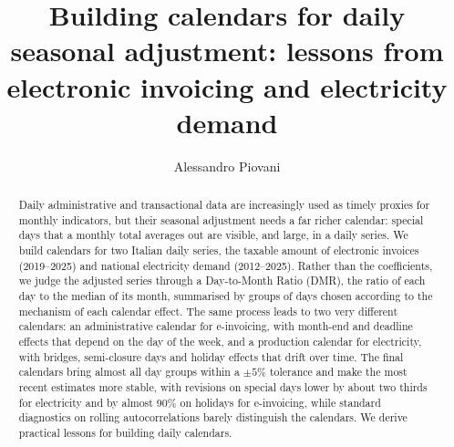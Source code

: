 \documentclass[Afour, times]{sagej}
\begin{document}
\setcounter{secnumdepth}{3}


\title{Building calendars for daily seasonal adjustment: lessons from electronic invoicing and electricity demand}

\author{Alessandro Piovani}




\begin{abstract}
Daily administrative and transactional data are increasingly used as timely proxies for monthly indicators, but their seasonal adjustment needs a far richer calendar: special days that a monthly total averages out are visible, and large, in a daily series. We build calendars for two Italian daily series, the taxable amount of electronic invoices (2019--2025) and national electricity demand (2012--2025). Rather than the coefficients, we judge the adjusted series through a Day-to-Month Ratio (DMR), the ratio of each day to the median of its month, summarised by groups of days chosen according to the mechanism of each calendar effect. The same process leads to two very different calendars: an administrative calendar for e-invoicing, with month-end and deadline effects that depend on the day of the week, and a production calendar for electricity, with bridges, semi-closure days and holiday effects that drift over time. The final calendars bring almost all day groups within a $\pm5\%$ tolerance and make the most recent estimates more stable, with revisions on special days lower by about two thirds for electricity and by almost 90\% on holidays for e-invoicing, while standard diagnostics on rolling autocorrelations barely distinguish the calendars. We derive practical lessons for building daily calendars.
\end{abstract}


\maketitle

\end{document}
